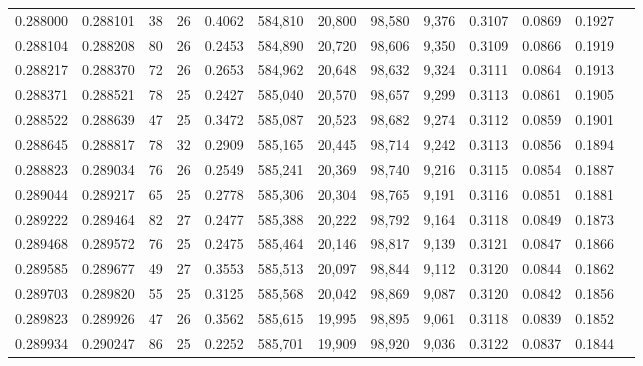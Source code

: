 \begin{tabular}{rrrrrrrrrrrrr}
0.288000 & 0.288101 &  38 &  26 &                                     0.4062 & 584,810 &  20,800 &  98,580 &   9,376 & 0.3107 & 0.0869 & 0.1927 \\
0.288104 & 0.288208 &  80 &  26 &                                     0.2453 & 584,890 &  20,720 &  98,606 &   9,350 & 0.3109 & 0.0866 & 0.1919 \\
0.288217 & 0.288370 &  72 &  26 &                                     0.2653 & 584,962 &  20,648 &  98,632 &   9,324 & 0.3111 & 0.0864 & 0.1913 \\
0.288371 & 0.288521 &  78 &  25 &                                     0.2427 & 585,040 &  20,570 &  98,657 &   9,299 & 0.3113 & 0.0861 & 0.1905 \\
0.288522 & 0.288639 &  47 &  25 &                                     0.3472 & 585,087 &  20,523 &  98,682 &   9,274 & 0.3112 & 0.0859 & 0.1901 \\
0.288645 & 0.288817 &  78 &  32 &                                     0.2909 & 585,165 &  20,445 &  98,714 &   9,242 & 0.3113 & 0.0856 & 0.1894 \\
0.288823 & 0.289034 &  76 &  26 &                                     0.2549 & 585,241 &  20,369 &  98,740 &   9,216 & 0.3115 & 0.0854 & 0.1887 \\
0.289044 & 0.289217 &  65 &  25 &                                     0.2778 & 585,306 &  20,304 &  98,765 &   9,191 & 0.3116 & 0.0851 & 0.1881 \\
0.289222 & 0.289464 &  82 &  27 &                                     0.2477 & 585,388 &  20,222 &  98,792 &   9,164 & 0.3118 & 0.0849 & 0.1873 \\
0.289468 & 0.289572 &  76 &  25 &                                     0.2475 & 585,464 &  20,146 &  98,817 &   9,139 & 0.3121 & 0.0847 & 0.1866 \\
0.289585 & 0.289677 &  49 &  27 &                                     0.3553 & 585,513 &  20,097 &  98,844 &   9,112 & 0.3120 & 0.0844 & 0.1862 \\
0.289703 & 0.289820 &  55 &  25 &                                     0.3125 & 585,568 &  20,042 &  98,869 &   9,087 & 0.3120 & 0.0842 & 0.1856 \\
0.289823 & 0.289926 &  47 &  26 &                                     0.3562 & 585,615 &  19,995 &  98,895 &   9,061 & 0.3118 & 0.0839 & 0.1852 \\
0.289934 & 0.290247 &  86 &  25 &                                     0.2252 & 585,701 &  19,909 &  98,920 &   9,036 & 0.3122 & 0.0837 & 0.1844 \\

\end{tabular}
